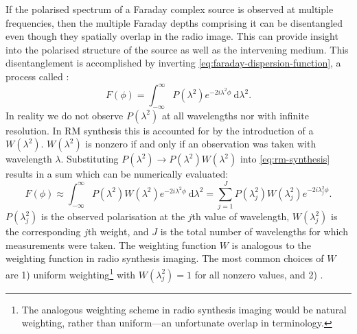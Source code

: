         If the polarised spectrum of a Faraday complex source is observed at multiple frequencies, then the multiple Faraday depths comprising it can be disentangled even though they spatially overlap in the radio image. This can provide insight into the polarised structure of the source as well as the intervening medium. This disentanglement is accomplished by inverting \autoref{eq:faraday-dispersion-function}, a process called  \citep{brentjens_faraday_2005}:
        \begin{equation}
            \label{eq:rm-synthesis}
            F(\phi) = \int_{-\infty}^\infty P(\lambda^2) e^{-2i\lambda^2\phi}\ \mathrm{d}\lambda^2.
        \end{equation}
        In reality we do not observe $P(\lambda^2)$ at all wavelengths nor with infinite resolution. In RM synthesis this is accounted for by the introduction of a  \citep[or , e.g.][]{heald09faraday} $W(\lambda^2)$. $W(\lambda^2)$ is nonzero if and only if an observation was taken with wavelength $\lambda$. Substituting $P(\lambda^2) \to P(\lambda^2) W(\lambda^2)$ into \autoref{eq:rm-synthesis} results in a sum which can be numerically evaluated:
        \begin{equation}
            \label{eq:weighted-rm-synthesis}
            F(\phi) \approx \int_{-\infty}^\infty P(\lambda^2) W(\lambda^2) e^{-2i\lambda^2\phi}\ \mathrm{d}\lambda^2 = \sum_{j = 1}^J P(\lambda^2_j) W(\lambda^2_j) e^{-2i\lambda^2_j\phi}.
        \end{equation}
        $P(\lambda^2_j)$ is the observed polarisation at the $j$th value of wavelength, $W(\lambda^2_j)$ is the corresponding $j$th weight, and $J$ is the total number of wavelengths for which measurements were taken. The weighting function $W$ is analogous to the weighting function in radio synthesis imaging. The most common choices of $W$ are 1) uniform weighting\footnote{The analogous weighting scheme in radio synthesis imaging would be natural weighting, rather than uniform---an unfortunate overlap in terminology.} with $W(\lambda_j^2) = 1$ for all nonzero values, and 2) . 

